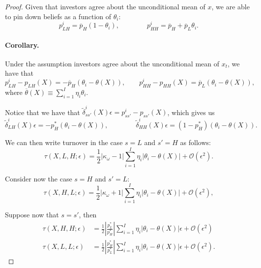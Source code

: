 \begin{proof}
Given that investors agree about the unconditional mean of $x$, we are able to pin down beliefs as a function of $\theta_i$:
\begin{equation}
    p_{LH}^i = \overline{p}_H (1- \theta_i), \qquad \qquad 
    p_{HH}^i = \overline{p}_H+\overline{p}_L \theta_i.
\end{equation}

\paragraph{Corollary.} Under the assumption investors agree about the unconditional mean of $x_t$, we have that
\begin{equation}
    p_{LH}^i - p_{LH}(X) = - \overline{p}_H (\theta_i - \theta(X)), \qquad
    p_{HH}^i - p_{HH}(X) = \overline{p}_L (\theta_i - \theta(X)),
\end{equation}
where $\overline{\theta}(X) \equiv \sum_{i=1}^I \eta_i \theta_i$.

Notice that we have that  $\tilde{\delta}_{ss'}^i(X) \epsilon = p_{ss'}^i - p_{ss'}(X)$, which gives us
\begin{equation}
    \tilde{\delta}_{LH}^i(X) \epsilon = - p^*_H (\theta_i - \theta(X)), \qquad \qquad
    \tilde{\delta}_{HH}^i(X) \epsilon = (1-p^*_H) (\theta_i - \theta(X)).
\end{equation}

We can then write turnover in the case $s = L$ and $s' = H$ as follows:
\begin{equation}
    \tau(X,L,H;\epsilon) = \frac{1}{2}\left\lvert  \kappa_\omega-1\right\rvert \sum_{i=1}^I \eta_i |\theta_i - \theta(X)| + \mathcal{O}(\epsilon^2).
\end{equation}

Consider now the case $s = H$ and $s' = L$:
\begin{equation}
    \tau(X,H,L;\epsilon) = \frac{1}{2}\left\lvert \kappa_\omega+ 1 \right\rvert \sum_{i=1}^I \eta_i |\theta_i - \theta(X)| + \mathcal{O}(\epsilon^2),
\end{equation}

Suppose now that $s = s' $, then
\begin{align}
    \tau(X,H,H;\epsilon) &= \frac{1}{2}\left\lvert  \frac{p^*_L}{p_{H}^*} \right\rvert \sum_{i=1}^I \eta_i |\theta_i - \theta(X)| \epsilon + \mathcal{O}(\epsilon^2) \\
    \tau(X,L,L;\epsilon) &= \frac{1}{2}\left\lvert  \frac{p^*_H}{p_{L}^*} \right\rvert \sum_{i=1}^I \eta_i |\theta_i - \theta(X)| \epsilon + \mathcal{O}(\epsilon^2).
\end{align}

\end{proof}
